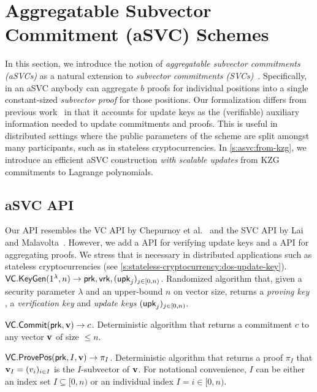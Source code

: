 \section{Aggregatable Subvector Commitment (aSVC) Schemes}
\label{s:svc}

In this section, we introduce the notion of \textit{aggregatable subvector commitments (aSVCs)} as a natural extension to \textit{subvector commitments (SVCs)}~\cite{LM19}.
Specifically, in an aSVC anybody can aggregate $b$ proofs for individual positions into a single constant-sized \textit{subvector proof} for those positions.
Our formalization differs from previous work~\cite{BBF18,GRWZ20,CFG+20} in that it accounts for update keys as the (verifiable) auxiliary information needed to update commitments and proofs.
This is useful in distributed settings where the public parameters of the scheme are split amongst many participants, such as in stateless cryptocurrencies.
In \cref{s:asvc:from-kzg}, we introduce an efficient aSVC construction \textit{with scalable updates} from KZG commitments to Lagrange polynomials.

\subsection{aSVC API}
\label{s:prelim:vcs:api}
\label{s:asvc:defs}

Our API resembles the VC API by Chepurnoy et al.~\cite{CPZ18} and the SVC API by Lai and Malavolta~\cite{LM19}.
However, we add a \vcverifyupk API for verifying update keys and a \vcaggregateproofs API for aggregating proofs.
We stress that \vcverifyupk is necessary in distributed applications such as stateless cryptocurrencies (see \cref{s:stateless-cryptocurrency:dos-update-key}).
\\

\api $\mathsf{VC}.\mathsf{KeyGen}(1^\lambda, n)\rightarrow \mathsf{prk},\mathsf{vrk},(\mathsf{upk}_j)_{j\in[0,n)}$.
Randomized algorithm that, given a security parameter $\lambda$ and an upper-bound $n$ on vector size, returns a \textit{proving key} \prk, a \textit{verification key} \vrk and \textit{update keys} $(\mathsf{upk}_j)_{j\in[0,n)}$.

\api $\mathsf{VC}.\mathsf{Commit}(\mathsf{prk}, \bm{\mathrm{v}}) \rightarrow c$.
Deterministic algorithm that returns a commitment $c$ to any vector $\bm{\mathrm{v}}$ of size $\le n$.

\api $\mathsf{VC}.\mathsf{ProvePos}(\mathsf{prk}, I, \bm{\mathrm{v}}) \rightarrow \pi_I$.
Deterministic algorithm that returns a proof $\pi_I$ that $\bm{\mathrm{v}}_I = (v_i)_{i\in I}$ is the $I$-subvector of $\bm{\mathrm{v}}$.
For notational convenience, $I$ can be either an index set $I\subseteq [0,n)$ or an individual index $I = i\in [0,n)$.

